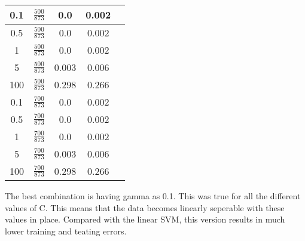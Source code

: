 \documentclass[12pt, fullpage,letterpaper]{article}
\begin{document}
\begin{enumerate}
\begin{enumerate}
\begin{table}[h]
\begin{tabular}{c|c|c|c|c}
		0.1 & $\frac{500}{873}$ & 0.0 & 0.002 \\ \hline
		0.5 & $\frac{500}{873}$ & 0.0 & 0.002  \\ \hline
		1 & $\frac{500}{873}$ & 0.0 & 0.002  \\ \hline
		5 & $\frac{500}{873}$ & 0.003 & 0.006  \\ \hline
		100 & $\frac{500}{873}$ & 0.298 & 0.266  \\ \hline

		0.1 & $\frac{700}{873}$ & 0.0 & 0.002 \\ \hline
		0.5 & $\frac{700}{873}$ & 0.0 & 0.002  \\ \hline
		1 & $\frac{700}{873}$ & 0.0 & 0.002  \\ \hline
		5 & $\frac{700}{873}$ & 0.003 & 0.006  \\ \hline
		100 & $\frac{700}{873}$ & 0.298 & 0.266  \\ \hline
	\end{tabular}
\end{table}
	\newline The best combination is having gamma as 0.1. This was true for all the different values of C. This means that the data becomes linearly seperable with these values in place. Compared with the linear SVM, this version results in much lower training and teating errors. 
	

\end{enumerate}
\end{enumerate}
\end{document}

